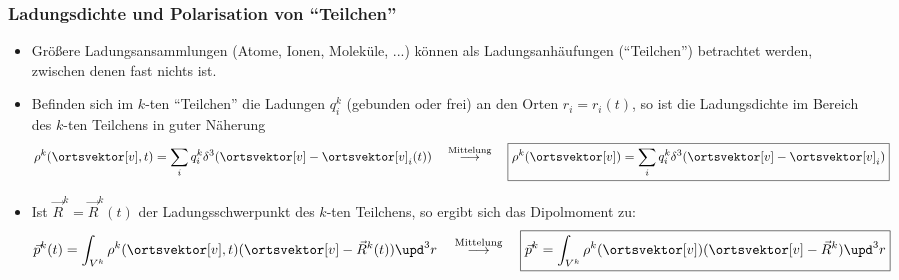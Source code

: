 \begin{frame}

  \frametitle{Ladungsdichte und Polarisation von \enquote{Teilchen}}
  \begin{itemize}[<+->]
  \item Größere Ladungsansammlungen (Atome, Ionen, Moleküle, ...) können als Ladungsanhäufungen (\enquote{Teilchen}) betrachtet werden, zwischen denen fast nichts ist.
  \item Befinden sich im $k$-ten \enquote{Teilchen} die Ladungen  $q_i^k$ (gebunden oder frei) an den Orten $r_i = r_i(t)$, so ist die \alert{Ladungsdichte im Bereich des $k$-ten Teilchens} in guter Näherung
    $$
    \rho^k(\ortsvektor[v], t) = \sum_i q_i^k \delta^3(\ortsvektor[v] - \ortsvektor[v]_i(t) ) \quad \stackrel{\text{Mittelung}}{\longrightarrow} \quad \boxed{\rho^k(\ortsvektor[v]) = \sum_i q_i^k \delta^3(\ortsvektor[v] - \ortsvektor[v]_i )} 
    $$
  \item Ist $\vec{R}^k=\vec{R}^k(t)$ der \alert{Ladungsschwerpunkt} des $k$-ten Teilchens, so ergibt sich das \alert{Dipolmoment} zu:
    $$
    \vec{p}^k(t) = \int_{V^k} \rho^k(\ortsvektor[v], t) (\ortsvektor[v] - \vec{R}^k(t) ) \upd^3r \quad \stackrel{\text{Mittelung}}{\longrightarrow} \quad \boxed{\vec{p}^k = \int_{V^k} \rho^k(\ortsvektor[v]) (\ortsvektor[v] - \vec{R}^k ) \upd^3r}
    $$
  \end{itemize}
  
  \end{frame}

